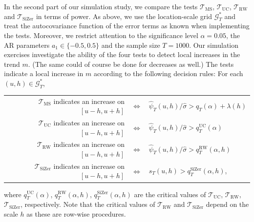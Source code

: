 In the second part of our simulation study, we compare the tests $\mathcal{T}_{\text{MS}}$, $\mathcal{T}_{\text{UC}}$, $\mathcal{T}_{\text{RW}}$ and $\mathcal{T}_{\text{SiZer}}$ in terms of power. As above, we use the location-scale grid $\mathcal{G}_T^*$ and treat the autocovariance function of the error terms as known when implementing the tests. Moreover, we restrict attention to the significance level $\alpha=0.05$, the AR parameters $a_1 \in \{-0.5,0.5\}$ and the sample size $T=1000$. Our simulation exercises investigate the ability of the four tests to detect local increases in the trend $m$. (The same could of course be done for decreases as well.) The tests indicate a local increase in $m$ according to the following decision rules: For each $(u,h) \in \mathcal{G}_T^*$, 
\begin{center}
\begin{tabular}{rcl}
$\mathcal{T}_{\text{MS}}$ indicates an increase on $[u-h,u+h]$   & $\Longleftrightarrow$ & $\widehat{\psi}_T(u,h) / \widehat{\sigma} > q_T(\alpha) + \lambda(h)$ \\ 
$\mathcal{T}_{\text{UC}}$ indicates an increase on $[u-h,u+h]$   & $\Longleftrightarrow$ & $\widehat{\psi}_T(u,h) / \widehat{\sigma} > q_T^{\text{UC}}(\alpha)$ \\
$\mathcal{T}_{\text{RW}}$ indicates an increase on $[u-h,u+h]$   & $\Longleftrightarrow$ & $\widehat{\psi}_T(u,h) / \widehat{\sigma} > q_T^{\text{RW}}(\alpha,h)$ \\
$\mathcal{T}_{\text{SiZer}}$ indicates an increase on $[u-h,u+h]$ & $\Longleftrightarrow$ & $s_T(u,h) > q_T^{\text{SiZer}}(\alpha,h)$, 
\end{tabular}
\end{center}
where $q_T^{\text{UC}}(\alpha)$, $q_T^{\text{RW}}(\alpha,h)$, $q_T^{\text{SiZer}}(\alpha,h)$ are the critical values of $\mathcal{T}_{\text{UC}}$, $\mathcal{T}_{\text{RW}}$, $\mathcal{T}_{\text{SiZer}}$, respectively. Note that the critical values of $\mathcal{T}_{\text{RW}}$ and $\mathcal{T}_{\text{SiZer}}$ depend on the scale $h$ as these are row-wise procedures. 


